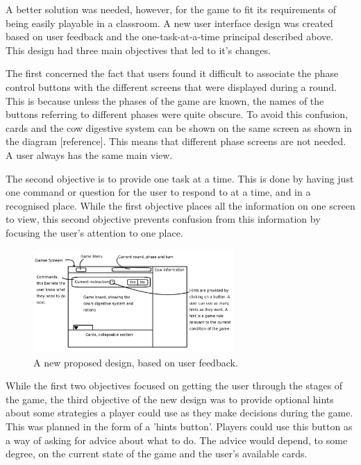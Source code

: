 A better solution was needed, however, for the game to fit its requirements of being easily playable in a classroom. A new user interface design was created based on user feedback and the one-task-at-a-time principal described above. This design had three main objectives that led to it's changes. 

The first concerned the fact that users found it difficult to associate the phase control buttons with the different screens that were displayed during a round. This is because unless the phases of the game are known, the names of the buttons referring to different phases were quite obscure. To avoid this confusion, cards and the cow digestive system can be shown on the same screen as shown in the diagram [reference]. This means that different phase screens are not needed. A user always has the same main view.

The second objective is to provide one task at a time. This is done by having just one command or question for the user to respond to at a time, and in a recognised place. While the first objective places all the information on one screen to view, this second objective prevents confusion from this information by focusing the user's attention to one place.

\begin{figure}[h]
\centering
\includegraphics[width=3in]{Images/4/new-design}
\caption{A new proposed design, based on user feedback.}
\label{4_new_design}
\end{figure}

While the first two objectives focused on getting the user through the stages of the game, the third objective of the new design was to provide optional hints about some strategies a player could use as they make decisions during the game. This was planned in the form of a 'hints button'. Players could use this button as a way of asking for advice about what to do. The advice would depend, to some degree, on the current state of the game and the user's available cards.


